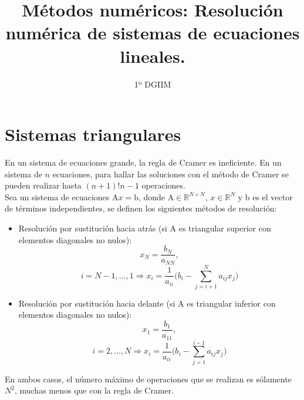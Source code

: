 \documentclass{article}
\title{\LARGE{\textbf{Métodos numéricos: Resolución numérica de sistemas de ecuaciones lineales.}}}
\author{1º DGIIM}
\date{}
\begin{document}
\maketitle
\hrulefill
%
%
\section{Sistemas triangulares}

En un sistema de ecuaciones grande, la regla de Cramer es ineficiente. En un sistema de $n$ ecuaciones, para hallar las soluciones con el método de Cramer se pueden realizar hasta $(n+1)!n-1$ operaciones.
\\
Sea un sistema de ecuaciones $\text{A}x=\text{b}$, donde $\text{A}\in\mathbb{R}^{N\times N}$, $x\in\mathbb{R}^N$ y b es el vector de términos independientes, se definen los siguientes métodos de resolución:
\begin{itemize}
\item Resolución por sustitución hacia atrás (si A es triangular superior con elementos diagonales no nulos):
$$x_N=\frac{b_N}{a_{NN}},$$
$$i=N-1,\dots,1\Rightarrow x_i=\frac{1}{a_{ii}}\bigg(b_i-\sum_{j=i+1}^Na_{ij}x_j \bigg)$$
\item Resolución por sustitución hacia delante (si A es triangular inferior con elementos diagonales no nulos):
$$x_1=\frac{b_1}{a_{11}},$$
$$i=2,\dots,N\Rightarrow x_i=\frac{1}{a_{ii}}\bigg(b_i-\sum_{j=1}^{i-1}a_{ij}x_j \bigg)$$
\end{itemize}
En ambos casos, el número máximo de operaciones que se realizan es sólamente $N^2$, muchas menos que con la regla de Cramer.
%
%
\end{document}
